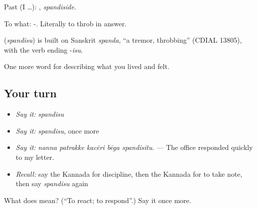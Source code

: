 Past (I …): , \emph{spandiside}.

To what: -. Literally to throb in answer.

\begin{cousinweb}
\textbf{} (\emph{spandisu}) is built on Sanskrit \emph{spanda}, \textquotedblleft{}a tremor, throbbing\textquotedblright{} (CDIAL 13805), with the verb ending -\emph{isu}.
\end{cousinweb}

\begin{grammarlens}[title={What you've built}]
One more word for describing what you lived and felt.
\end{grammarlens}

\subsection*{Your turn}
\begin{itemize}
\raggedright
  \item \emph{Say it:} \emph{spandisu}
  \item \emph{Say it:} \emph{spandisu}, once more
  \item \emph{Say it:} \emph{nanna patrakke kacēri bēga spandisitu.} — The office responded quickly to my letter.
  \item \emph{Recall:} say the Kannada for discipline, then the Kannada for to take note, then say \emph{spandisu} again
\end{itemize}

\begin{tcolorbox}[breakable,colback=teal!4,colframe=teal!35!black,title={Before you move on}]
What does  mean? (\textquotedblleft{}To react; to respond\textquotedblright{}.) Say it once more.
\end{tcolorbox}
